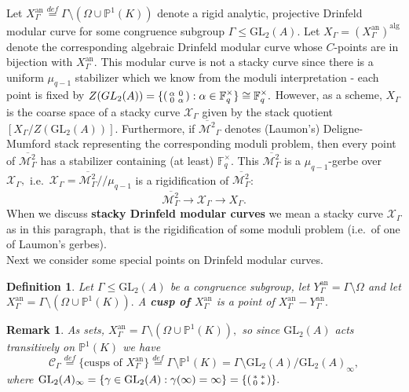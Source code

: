 \documentclass[11pt]{amsart}
\newtheorem{definition}[theorem]{Definition}
\newtheorem{remark}[theorem]{Remark}
\theoremstyle{definition}
\newenvironment{psmallmatrix}
{\left(\begin{smallmatrix}}
	{\end{smallmatrix}\right)}
\numberwithin{equation}{section}
\newcommand{\GL}{\mathrm{GL}} 	%
\newcommand{\cC}{\mathcal{C}}		%
\newcommand{\cM}{\mathcal{M}}		%
\newcommand{\sX}{\mathscr{X}}		%
\newcommand{\bbF}{\mathbb{F}}		%
\newcommand{\bbP}{\mathbb{P}}		%
\begin{document}
		Let $X_{\Gamma}^{\text{an}}\overset{def}{=}\Gamma\setminus(\Omega\cup \bbP^1(K))$ denote a rigid analytic, projective Drinfeld modular curve for some congruence subgroup $\Gamma\leq \GL_2(A).$
		Let $X_{\Gamma}=(X_{\Gamma}^{\text{an}})^{\text{alg}}$ denote the corresponding algebraic Drinfeld modular curve whose $C$-points are in bijection with $X_{\Gamma}^{\text{an}}.$ This modular curve is not a stacky curve since there is a uniform $\mu_{q-1}$ stabilizer which we know from the moduli interpretation - each point is fixed by $\displaystyle{Z(GL_2(A))=\{\begin{psmallmatrix}\alpha&0\\0&\alpha\end{psmallmatrix}:\alpha\in \bbF_q^{\times}\}\cong \bbF_q^{\times}}.$ However, as a scheme, $X_{\Gamma}$ is the coarse space of a stacky curve $\sX_{\Gamma}$ given by the stack quotient $[X_{\Gamma}/Z(\GL_2(A))].$ Furthermore, if $\overline{\cM^2}_{\Gamma}$ denotes (Laumon's) Deligne-Mumford stack representing the corresponding moduli problem, then every point of $\overline{\cM^2_{\Gamma}}$ has a stabilizer containing (at least) $\bbF_q^{\times}.$ This $\overline{\cM^2_{\Gamma}}$ is a $\mu_{q-1}$-gerbe over $\sX_{\Gamma},$ i.e.\ $\displaystyle{\sX_{\Gamma}=\overline{\cM^2_{\Gamma}}/\!/\mu_{q-1}}$ is a rigidification of $\overline{\cM^2_{\Gamma}}$:
		\[\overline{\cM^2_{\Gamma}}\to \sX_{\Gamma}\to X_{\Gamma}.\]
		When we discuss \textbf{stacky Drinfeld modular curves} we mean a stacky curve $\sX_{\Gamma}$ as in this paragraph, that is the rigidification of some moduli problem (i.e.\ of one of Laumon's gerbes).\\ 
		
		Next we consider some special points on Drinfeld modular curves. 
		\begin{definition}
			Let $\Gamma\leq \GL_2(A)$ be a congruence subgroup, let $Y_{\Gamma}^{\text{an}}=\Gamma\setminus \Omega$ and let $X_{\Gamma}^{\text{an}}=\Gamma\setminus(\Omega\cup \bbP^1(K)).$ A \textbf{cusp of $X_{\Gamma}^{\text{an}}$} is a point of $X_{\Gamma}^{\text{an}}-Y_{\Gamma}^{\text{an}}.$ 
		\end{definition}
		
		\begin{remark}
			As sets, $X_{\Gamma}^{\text{an}}=\Gamma\setminus(\Omega\cup \bbP^1(K)),$ so since $\GL_2(A)$ acts transitively on $\bbP^1(K)$ we have
			\[\cC_{\Gamma}\overset{def}{=}\{\text{cusps of }X_{\Gamma}^{\text{an}}\}\overset{def}{=}\Gamma\setminus \bbP^1(K)=\Gamma\setminus \GL_2(A)/\GL_2(A)_{\infty},\]
			where $\displaystyle{\GL_2(A)_{\infty}=\{\gamma\in \GL_2(A):\gamma(\infty)=\infty\}=\left\{\begin{psmallmatrix}*&*\\0&*\end{psmallmatrix}\right\}}.$
		\end{remark}
		
\end{document}
